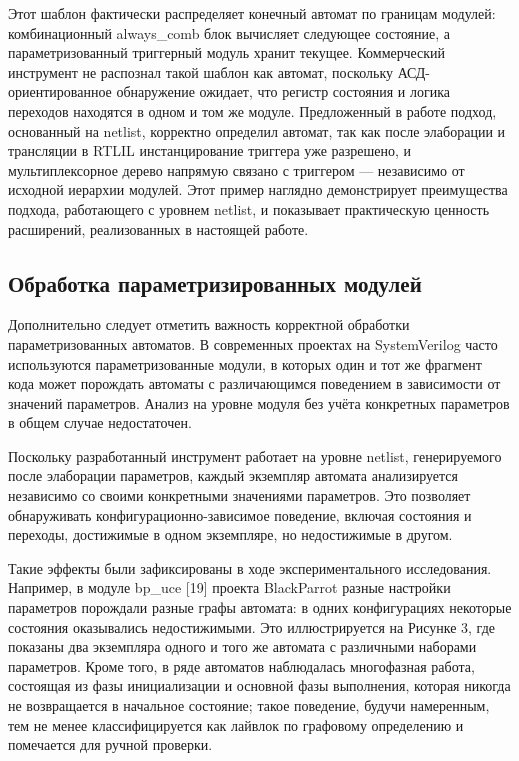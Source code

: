 Этот шаблон фактически распределяет конечный автомат по границам модулей: комбинационный always\_comb
блок вычисляет следующее состояние, а параметризованный триггерный модуль хранит текущее. Коммерческий
инструмент не распознал такой шаблон как автомат, поскольку АСД-ориентированное обнаружение ожидает, что
регистр состояния и логика переходов находятся в одном и том же модуле. Предложенный в работе подход,
основанный на netlist, корректно определил автомат, так как после элаборации и трансляции в RTLIL
инстанцирование триггера уже разрешено, и мультиплексорное дерево напрямую связано с триггером ---
независимо от исходной иерархии модулей. Этот пример наглядно демонстрирует преимущества подхода,
работающего с уровнем netlist, и показывает практическую ценность расширений, реализованных в настоящей работе.

\subsection{Обработка параметризированных модулей}

Дополнительно следует отметить важность корректной обработки параметризованных автоматов. В современных
проектах на SystemVerilog часто используются параметризованные модули, в которых один и тот же фрагмент
кода может порождать автоматы с различающимся поведением в зависимости от значений параметров. Анализ на
уровне модуля без учёта конкретных параметров в общем случае недостаточен.

Поскольку разработанный инструмент работает на уровне netlist, генерируемого после элаборации параметров,
каждый экземпляр автомата анализируется независимо со своими конкретными значениями параметров. Это
позволяет обнаруживать конфигурационно-зависимое поведение, включая состояния и переходы, достижимые в
одном экземпляре, но недостижимые в другом.

Такие эффекты были зафиксированы в ходе экспериментального исследования. Например, в модуле bp\_uce [19]
проекта BlackParrot разные настройки параметров порождали разные графы автомата: в одних конфигурациях
некоторые состояния оказывались недостижимыми. Это иллюстрируется на Рисунке 3, где показаны два экземпляра
одного и того же автомата с различными наборами параметров. Кроме того, в ряде автоматов наблюдалась
многофазная работа, состоящая из фазы инициализации и основной фазы выполнения, которая никогда не
возвращается в начальное состояние; такое поведение, будучи намеренным, тем не менее классифицируется как
лайвлок по графовому определению и помечается для ручной проверки.

